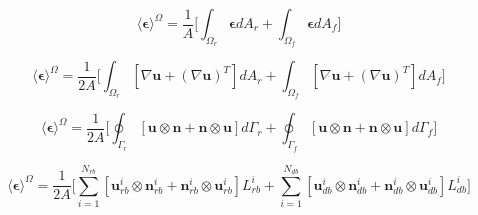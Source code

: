 \begin{equation}
\label{eqn:strain3}
\langle \boldsymbol{\epsilon} \rangle^\Omega = 
\frac{1}{A} \bigg \lbrack {\int_{\Omega_{r}} \boldsymbol{\epsilon} { dA_r} + 
\int_{\Omega_{f}} \boldsymbol{\epsilon} { dA_f}} \bigg \rbrack
\end{equation}

\begin{equation}
\label{eqn:strain4}
\langle \boldsymbol{\epsilon} \rangle^\Omega = 
\frac{1}{2 A} \bigg \lbrack {\int_{\Omega_{r}} \left[ \nabla \mathbf{u} + 
\left( \nabla \mathbf{u} \right)^{T} \right] {dA_r} +
\int_{\Omega_{f}} \left[ \nabla \mathbf{u} + 
\left( \nabla \mathbf{u} \right)^{T} \right] { dA_f}} \bigg \rbrack
\end{equation}

\begin{equation}
\label{eqn:strain5}
\langle \boldsymbol{\epsilon} \rangle^\Omega = 
\frac{1}{2 A} \bigg \lbrack {\oint_{\Gamma_{r}} \left[ \mathbf{u} \otimes \mathbf{n} + 
\mathbf{n} \otimes \mathbf{u} \right] {d \Gamma_r} +
\oint_{\Gamma_{f}} \left[ \mathbf{u} \otimes \mathbf{n} + 
\mathbf{n} \otimes \mathbf{u} \right] { d \Gamma_f}} \bigg \rbrack
\end{equation}

\begin{equation}
\label{eqn:strain6}
\langle \boldsymbol{\epsilon} \rangle^\Omega = 
\frac{1}{2 A} \bigg \lbrack {\sum_{i=1}^{N_{rb}} \left[ \mathbf{u}_{rb}^i \otimes \mathbf{n}_{rb}^i + 
\mathbf{n}_{rb}^i \otimes \mathbf{u}_{rb}^i \right] {L_{rb}^i} +
\sum_{i=1}^{N_{db}} \left[ \mathbf{u}_{db}^i \otimes \mathbf{n}_{db}^i + 
\mathbf{n}_{db}^i \otimes \mathbf{u}_{db}^i \right] {L_{db}^i}} \bigg \rbrack
\end{equation}
